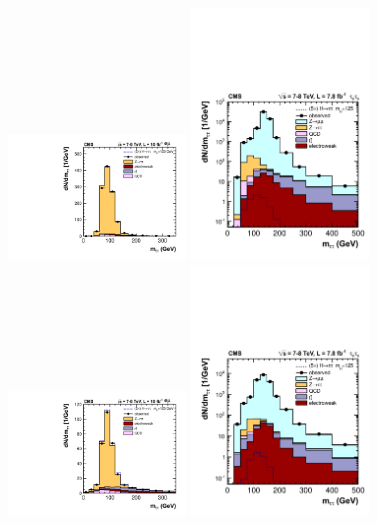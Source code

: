 \documentclass[12pt,twoside,a4paper,cmspaper,final,collab]{cms-tdr}
\begin{document}
\begin{figure}[htbp]
\begin{center}
\includegraphics[width=0.42\textwidth]{figures/htt/emu_0jet_rescaled_7and8TeV.pdf}
\includegraphics[width=0.42\textwidth]{figures/htt/mumu_rescaled_0jet_LOG.pdf} \\
\includegraphics[width=0.42\textwidth]{figures/htt/emu_boost_rescaled_7and8TeV.pdf}
\includegraphics[width=0.42\textwidth]{figures/htt/mumu_rescaled_1jet_LOG.pdf} \\

\end{center}
\end{figure}
\end{document}
